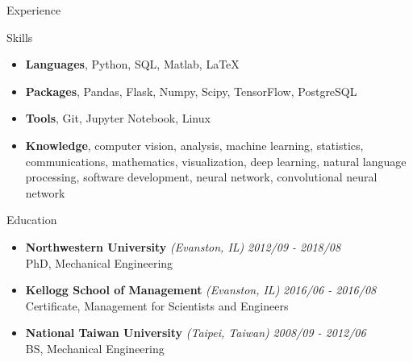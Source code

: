 \documentclass{resume} %
\begin{document}
\begin{rSection}{Experience}
\begin{itemize}
	
	\end{itemize}

\end{rSection}

\begin{rSection}{Skills}
\begin{itemize}
	\item {\bf Languages}{, Python, SQL, Matlab, LaTeX}
	\item {\bf Packages}{, Pandas, Flask, Numpy, Scipy, TensorFlow, PostgreSQL}
	\item {\bf Tools}{, Git, Jupyter Notebook, Linux}
	\item {\bf Knowledge}{, computer vision, analysis, machine learning, statistics, communications, mathematics, visualization, deep learning, natural language processing, software development, neural network, convolutional neural network}
	
\end{itemize}
\end{rSection}

\begin{rSection}{Education}
\begin{itemize}
	\item {\bf Northwestern University} \textit{(Evanston, IL)} \hfill {\em 2012/09 - 2018/08} 
	\\ PhD, Mechanical Engineering
	\item {\bf Kellogg School of Management} \textit{(Evanston, IL)} \hfill {\em 2016/06 - 2016/08} 
	\\ Certificate, Management for Scientists and Engineers
	\item {\bf National Taiwan University} \textit{(Taipei, Taiwan)} \hfill {\em 2008/09 - 2012/06} 
	\\ BS, Mechanical Engineering
\end{itemize}



\end{rSection}
\end{document}
